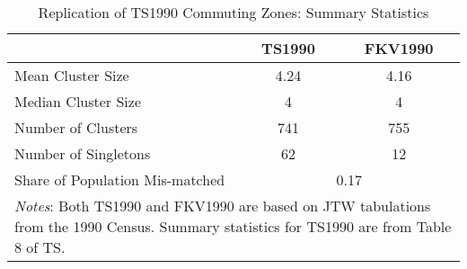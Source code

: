 
\begin{table}\centering
\caption{Replication of TS1990 Commuting Zones: Summary Statistics \label{tab:replication}}
\begin{tabular}{lcc}
\hline\hline
       & TS1990 &  FKV1990  \\
       \hline
Mean Cluster Size &  4.24  & 4.16 \\
Median Cluster Size & 4 & 4 \\
Number of Clusters & 741 & 755  \\
Number of Singletons & 62 &  12 \\
Share of Population Mis-matched & \multicolumn{2}{c}{0.17}\\
\hline
\multicolumn{3}{p{4in}}{\footnotesize \textit{Notes}: Both TS1990 and FKV1990 are based on JTW tabulations from the 1990 Census. Summary statistics for TS1990 are from Table 8 of TS.}\\
\end{tabular}
\end{table}

